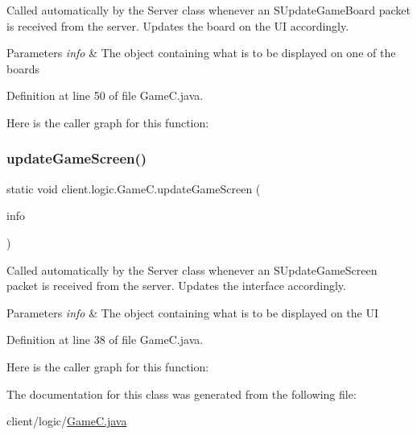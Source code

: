 Called automatically by the {\ttfamily Server} class whenever an {\ttfamily S\+Update\+Game\+Board} packet is received from the server. Updates the board on the UI accordingly.


\begin{DoxyParams}{Parameters}
{\em info} & The object containing what is to be displayed on one of the boards \\
\hline
\end{DoxyParams}


Definition at line 50 of file Game\+C.\+java.

Here is the caller graph for this function\+:
\hypertarget{classclient_1_1logic_1_1_game_c_a5efa8858529daa61b2c4639b9a7c2949}{}\label{classclient_1_1logic_1_1_game_c_a5efa8858529daa61b2c4639b9a7c2949} 
\subsubsection{\texorpdfstring{update\+Game\+Screen()}{updateGameScreen()}}
{\footnotesize\ttfamily static void client.\+logic.\+Game\+C.\+update\+Game\+Screen (\begin{DoxyParamCaption}\item[{\hyperlink{classpt_1_1up_1_1fe_1_1lpro1613_1_1sharedlib_1_1tuples_1_1_game_u_i_info}{Game\+U\+I\+Info}}]{info }\end{DoxyParamCaption})\hspace{0.3cm}{\ttfamily [static]}}

Called automatically by the {\ttfamily Server} class whenever an {\ttfamily S\+Update\+Game\+Screen} packet is received from the server. Updates the interface accordingly.


\begin{DoxyParams}{Parameters}
{\em info} & The object containing what is to be displayed on the UI \\
\hline
\end{DoxyParams}


Definition at line 38 of file Game\+C.\+java.

Here is the caller graph for this function\+:


The documentation for this class was generated from the following file\+:\begin{DoxyCompactItemize}
\item 
client/logic/\hyperlink{_game_c_8java}{Game\+C.\+java}\end{DoxyCompactItemize}
